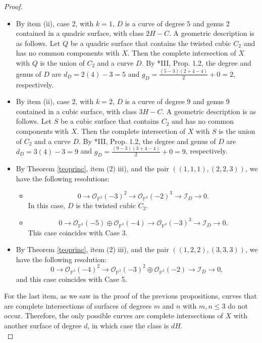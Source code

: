 \documentclass[12pt,reqno]{amsart}
\theoremstyle{plain}
\theoremstyle{definition}
\theoremstyle{remark}
\theoremstyle{definition}
\newcommand{\PP}{\mathds{P}}
\newcommand{\PPP}{\PP^{3}}
\newcommand{\ii}{\mathscr{I}}
\newcommand{\oo}{\mathcal{O}}
\begin{document}
\begin{proof}
\begin{itemize}
    \item[Case 5:] By item (ii), case 2, with $k=1$, $D$ is a curve of degree $5$ and genus $2$ contained in a quadric surface, with class $2H-C$. A geometric description is as follows. Let $Q$ be a quadric surface that contains the twisted cubic $C_{2}$ and has no common components with $X$. Then the complete intersection of $X$ with $Q$ is the union of $C_{2}$ and a curve $D$. By \cite{mdp2}*{III, Prop. 1.2}, the degree and genus of $D$ are $d_{D}=2(4)-3=5$ and $g_{D}=\frac{(5-3)(2+4-4)}{2}+0=2$, respectively.
    
    \item[Case 6:] By item (ii), case 2, with $k=2$, $D$ is a curve of degree $9$ and genus $9$ contained in a cubic surface, with class $3H-C$. A geometric description is as follows. Let $S$ be a cubic surface that contains $C_{2}$ and has no common components with $X$. Then the complete intersection of $X$ with $S$ is the union of $C_{2}$ and a curve $D$. By \cite{mdp2}*{III, Prop. 1.2}, the degree and genus of $D$ are $d_{D}=3(4)-3=9$ and $g_{D}=\frac{(9-3)(3+4-4)}{2}+0=9$, respectively.

    \item[Case 7:] By Theorem \ref{teoprinc}, item (2) iii), and the pair $((1,1,1),(2,2,3))$, we have the following resolutions:
    \begin{itemize}
        \item $$0\to \oo_{\PPP}(-3)^{2}\to \oo_{\PPP}(-2)^{3} \to \ii_{D}\to 0.$$
        In this case, $D$ is the twisted cubic $C_{2}$.
        \item $$0\to \oo_{\PPP}(-5)\oplus \oo_{\PPP}(-4)\to \oo_{\PPP}(-3)^{3} \to \ii_{D}\to 0.$$
        This case coincides with Case 3.
    \end{itemize} 

    \item[Case 8:] By Theorem \ref{teoprinc}, item (2) iii), and the pair $((1,2,2),(3,3,3))$, we have the following resolution:
    $$0\to \oo_{\PPP}(-4)^{2}\to \oo_{\PPP}(-3)^{2}\oplus \oo_{\PPP}(-2) \to \ii_{D}\to 0,$$
    and this case coincides with Case 5.
\end{itemize}

For the last item, as we saw in the proof of the previous propositions, curves that are complete intersections of surfaces of degrees $m$ and $n$ with $m,n\leq 3$ do not occur. Therefore, the only possible curves are complete intersections of $X$ with another surface of degree $d$, in which case the class is $dH$.\\
\end{proof}
\end{document}
